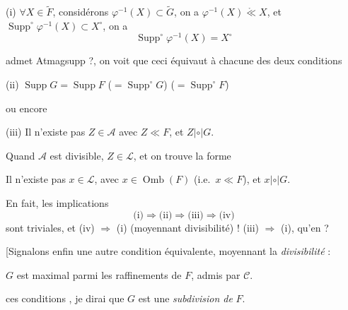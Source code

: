 \documentclass[11pt,a4paper]{article}
\begin{document}
(i) $\forall X \in \widetilde{F}$,  considérons $\varphi^{-1}(X) \subset \widetilde{G}$, on a $\varphi^{-1}(X) \mathrel{\mathring{\ll}} X$, et $\operatorname{Supp}^{\circ} \varphi^{-1}(X) \subset X^{\circ}$, on a   
\[
  \operatorname{Supp}^{\circ} \varphi^{-1}(X) = X^{\circ}
\]


 admet Atmagsupp ?, on voit que ceci équivaut à chacune des deux conditions

(ii) $\operatorname{Supp} G = \operatorname{Supp} F$ \quad ($= \operatorname{Supp}^{\circ} G$) \quad ($= \operatorname{Supp}^{\circ} F$)

ou encore

(iii) Il n'existe pas $Z \in \mathcal{A}$ avec $Z \ll F$, et $Z \mathrel{|{\circ}|} G$.

Quand $\mathcal{A}$ est divisible, \struck{\ill{}} $Z \in \mathcal{L}$, et on trouve la forme

  Il n'existe pas $x \in \mathcal{L}$, avec $x \in \operatorname{Omb}(F)$ (i.e.\ $x \ll F$), et $x \mathrel{|{\circ}|} G$.

En fait, les implications
\[
  \text{(i)} \Rightarrow \text{(ii)} \Rightarrow \text{(iii)} \Rightarrow \text{(iv)}
\]
sont triviales, et (iv) $\Rightarrow$ (i) (moyennant divisibilité)  ! (iii) $\Rightarrow$ (i), qu'en \ill{}  ?

[Signalons enfin une autre condition équivalente, moyennant la \emph{divisibilité} :

  $G$ est maximal parmi les raffinements de $F$, admis par \struck{\ill{}} $\mathcal{C}$.

  ces conditions \struck{\ill{}}  \struck{\ill{}}, je dirai \struck{\ill{}} que $G$ est une \emph{subdivision de} $F$. 

\marginal{\ill{}}


\end{document}
